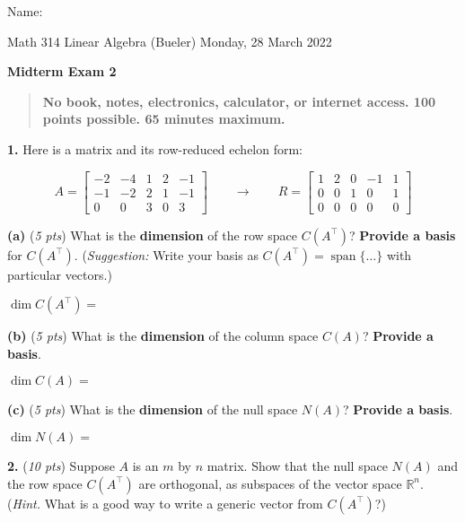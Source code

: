 \documentclass[11pt]{amsart}
\newcommand{\RR}{{\mathbb{R}}}
\newcommand{\Span}{\operatorname{span}}
\newcommand{\prob}[1]{\bigskip\noindent\textbf{#1.} }
\newcommand{\pts}[1]{(\emph{#1 pts})}
\newcommand{\probpts}[2]{\prob{#1} \pts{#2} \quad}
\newcommand{\epartpts}[2]{\medskip\noindent \textbf{(#1)} \pts{#2} \quad}
\newcommand{\dbox}{\boxed{\phantom{\begin{bmatrix} I & I \\ O & O \end{bmatrix}}}}
\begin{document}
\hfill \Large Name:\underline{\phantom{Ed Bueler really really long long long name}}
\medskip

\scriptsize \noindent Math 314 Linear Algebra (Bueler) \hfill Monday, 28 March 2022
\medskip

\LARGE\centerline{\textbf{Midterm Exam 2}}

\smallskip
\begin{quote}
\large
\textbf{No book, notes, electronics, calculator, or internet access.  100 points possible. 65 minutes maximum.}
\end{quote}

\normalsize
\medskip

\thispagestyle{empty}

\prob{1}  Here is a matrix and its row-reduced echelon form:


    $$A = \begin{bmatrix} -2 & -4 & 1 & 2 & -1 \\ -1 & -2 & 2 & 1 & -1 \\ 0 & 0 & 3 & 0 & 3 \end{bmatrix}
      \qquad \to \qquad
      R = \begin{bmatrix} 1 & 2 & 0 & -1 & 1 \\ 0 & 0 & 1 & 0 & 1 \\ 0 & 0 & 0 & 0 & 0 \end{bmatrix}$$

\epartpts{a}{5}  What is the \textbf{dimension} of the row space $C(A^\top)$?  \textbf{Provide a basis} for $C(A^\top)$.  (\emph{Suggestion:}  Write your basis as $C(A^\top)=\Span\{\dots\}$ with particular vectors.)

\medskip
\noindent $\dim C(A^\top) = $ \dbox
\vfill

\epartpts{b}{5}  What is the \textbf{dimension} of the column space $C(A)$?  \textbf{Provide a basis}.

\medskip
\noindent $\dim C(A) = $ \dbox
\vfill

\epartpts{c}{5}  What is the \textbf{dimension} of the null space $N(A)$?  \textbf{Provide a basis}.

\medskip
\noindent $\dim N(A) = $ \dbox
\vfill


\clearpage
\newpage
\probpts{2}{10}  Suppose $A$ is an $m$ by $n$ matrix.  Show that the null space $N(A)$ and the row space $C(A^\top)$ are orthogonal, as subspaces of the vector space $\RR^n$.  (\emph{Hint.} What is a good way to write a generic vector from $C(A^\top)$?)
\vfill
\end{document}
